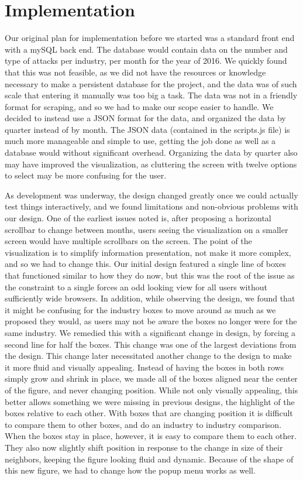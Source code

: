 \documentclass[journal]{vgtc}                %
\begin{document}
\section{Implementation}
Our original plan for implementation before we started was a standard front end with a mySQL back end. The database 
would contain data on the number and type of attacks per industry, per month for the year of 2016. We quickly found
that this was not feasible, as we did not have the resources or knowledge necessary to make a persistent database for
the project, and the data was of such scale that entering it manually was too big a task. The data was not in a friendly
format for scraping, and so we had to make our scope easier to handle. We decided to instead use a JSON format for the 
data, and organized the data by quarter instead of by month. The JSON data (contained in the scripts.js file) is much
more manageable and simple to use, getting the job done as well as a database would without significant overhead.
Organizing the data by quarter also may have improved the visualization, as cluttering the screen with twelve options
to select may be more confusing for the user.

As development was underway, the design changed greatly once we could actually test things interactively, and we found 
limitations and non-obvious problems with our design. One of the earliest issues noted is, after proposing a horizontal
scrollbar to change between months, users seeing the visualization on a smaller screen would have multiple scrollbars 
on the screen. The point of the visualization is to simplify information presentation, not make it more complex, and so 
we had to change this. Our initial design featured a single line of boxes that functioned similar to how they do now,
but this was the root of the issue as the constraint to a single forces an odd looking view for all users without 
sufficiently wide browsers. In addition, while observing the design, we found that it might be confusing for the industry
boxes to move around as much as we proposed they would, as users may not be aware the boxes no longer were for the same 
industry. We remedied this with a significant change in design, by forcing a second line for half the boxes. This change 
was one of the largest deviations from the design. This change later necessitated another change to the design to make
it more fluid and visually appealing. Instead of having the boxes in both rows simply grow and shrink in place, we made
all of the boxes aligned near the center of the figure, and never changing position. While not only visually appealing, this better allows something 
we were missing in previous designs, the highlight of the boxes relative to each other. With boxes that are changing position
it is difficult to compare them to other boxes, and do an industry to industry comparison. When the boxes stay in place, 
however, it is easy to compare them to each other. They also now slightly shift position in response to the change in size
of their neighbors, keeping the figure looking fluid and dynamic. Because of the shape of this new figure, we had to change 
how the popup menu works as well.
\end{document}
